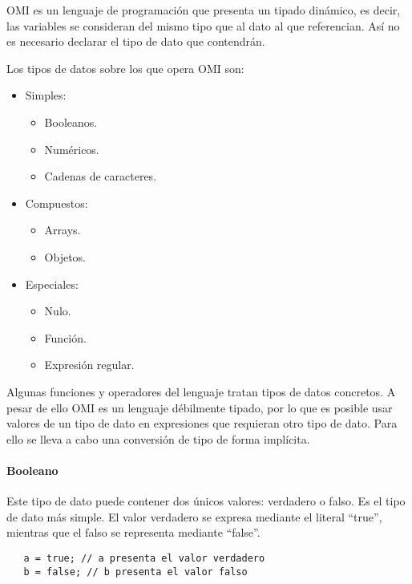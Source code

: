 OMI es un lenguaje de programación que presenta un tipado dinámico, es decir, las variables se consideran del mismo tipo que al dato al que 
referencian. Así no es necesario declarar el tipo de dato que contendrán.

Los tipos de datos sobre los que opera OMI son:
\begin{itemize}
\item Simples:
\begin{itemize}
   \item Booleanos.
   \item Numéricos.
   \item Cadenas de caracteres.
\end{itemize}
\item Compuestos:
\begin{itemize}
   \item Arrays.
   \item Objetos.
\end{itemize}
\item Especiales:
\begin {itemize}
   \item Nulo.
   \item Función.
   \item Expresión regular.
\end{itemize}
\end{itemize}

Algunas funciones y operadores del lenguaje tratan tipos de datos concretos. A pesar de ello OMI es un lenguaje débilmente tipado, por
lo que es posible usar valores de un tipo de dato en expresiones que requieran otro tipo de dato. Para ello se lleva a cabo una conversión de
tipo de forma implícita.

\paragraph{Booleano}\label{sec:type_bool}
Este tipo de dato puede contener dos únicos valores: verdadero o falso. Es el tipo de dato 
más simple. El valor verdadero se expresa mediante el literal ``true'', mientras que el 
falso se representa mediante ``false''. \\

\begin{lstlisting}
   a = true; // a presenta el valor verdadero
   b = false; // b presenta el valor falso
\end{lstlisting}
\hfill\\

